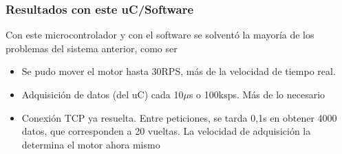 \subsubsection{Resultados con este uC/Software}
    Con este microcontrolador y con el software se solventó la mayoría de los problemas del sistema anterior, como ser
    \begin{itemize}
        \item Se pudo mover el motor hasta 30RPS, más de la velocidad de tiempo real.
        \item Adquisición de datos (del uC) cada 10$\mu$s o 100ksps. Más de lo necesario
        \item Conexión TCP ya resuelta. Entre peticiones, se tarda 0,1s en obtener 4000 datos, que corresponden a 20 vueltas. La velocidad de adquisición la determina el motor ahora mismo 
\end{itemize}



